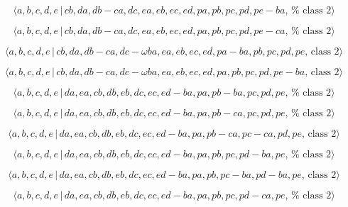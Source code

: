 \documentclass[10pt]{article}
\begin{document}
\begin{equation}
\langle a,b,c,d,e\,|\,cb,da,db-ca,dc,ea,eb,ec,ed,pa,pb,pc,pd,pe-ba,\,\text{%
class }2\rangle  \tag{7.4611}
\end{equation}

\begin{equation}
\langle a,b,c,d,e\,|\,cb,da,db-ca,dc,ea,eb,ec,ed,pa,pb,pc,pd,pe-ca,\,\text{%
class }2\rangle  \tag{7.4612}
\end{equation}

\begin{equation}
\langle a,b,c,d,e\,|\,cb,da,db-ca,dc-\omega
ba,ea,eb,ec,ed,pa-ba,pb,pc,pd,pe,\,\text{class }2\rangle  \tag{7.4613}
\end{equation}

\begin{equation}
\langle a,b,c,d,e\,|\,cb,da,db-ca,dc-\omega
ba,ea,eb,ec,ed,pa,pb,pc,pd,pe-ba,\,\text{class }2\rangle  \tag{7.4614}
\end{equation}

\begin{equation}
\langle a,b,c,d,e\,|\,da,ea,cb,db,eb,dc,ec,ed-ba,pa,pb-ba,pc,pd,pe,\,\text{%
class }2\rangle  \tag{7.4615}
\end{equation}

\begin{equation}
\langle a,b,c,d,e\,|\,da,ea,cb,db,eb,dc,ec,ed-ba,pa,pb-ca,pc,pd,pe,\,\text{%
class }2\rangle  \tag{7.4616}
\end{equation}

\begin{equation}
\langle a,b,c,d,e\,|\,da,ea,cb,db,eb,dc,ec,ed-ba,pa,pb-ca,pc-ca,pd,pe,\,%
\text{class }2\rangle  \tag{7.4617}
\end{equation}

\begin{equation}
\langle a,b,c,d,e\,|\,da,ea,cb,db,eb,dc,ec,ed-ba,pa,pb,pc,pd-ba,pe,\,\text{%
class }2\rangle  \tag{7.4618}
\end{equation}

\begin{equation}
\langle a,b,c,d,e\,|\,da,ea,cb,db,eb,dc,ec,ed-ba,pa,pb,pc-ba,pd-ba,pe,\,%
\text{class }2\rangle  \tag{7.4619}
\end{equation}

\begin{equation}
\langle a,b,c,d,e\,|\,da,ea,cb,db,eb,dc,ec,ed-ba,pa,pb,pc,pd-ca,pe,\,\text{%
class }2\rangle  \tag{7.4620}
\end{equation}
\end{document}
